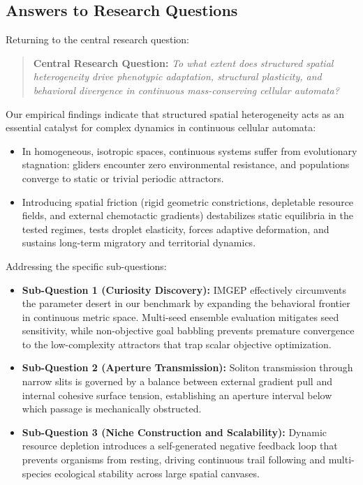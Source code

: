 \subsection{Answers to Research Questions}
\label{subsec:concl_answers}

Returning to the central research question:

\begin{quote}
\textbf{Central Research Question:} \textit{To what extent does structured spatial heterogeneity drive phenotypic adaptation, structural plasticity, and behavioral divergence in continuous mass-conserving cellular automata?}
\end{quote}

Our empirical findings indicate that structured spatial heterogeneity acts as an essential catalyst for complex dynamics in continuous cellular automata:
\begin{itemize}
    \item In homogeneous, isotropic spaces, continuous systems suffer from evolutionary stagnation: gliders encounter zero environmental resistance, and populations converge to static or trivial periodic attractors.
    \item Introducing spatial friction (rigid geometric constrictions, depletable resource fields, and external chemotactic gradients) destabilizes static equilibria in the tested regimes, tests droplet elasticity, forces adaptive deformation, and sustains long-term migratory and territorial dynamics.
\end{itemize}

Addressing the specific sub-questions:
\begin{itemize}
    \item \textbf{Sub-Question 1 (Curiosity Discovery):} IMGEP effectively circumvents the parameter desert in our benchmark by expanding the behavioral frontier in continuous metric space. Multi-seed ensemble evaluation mitigates seed sensitivity, while non-objective goal babbling prevents premature convergence to the low-complexity attractors that trap scalar objective optimization.
    \item \textbf{Sub-Question 2 (Aperture Transmission):} Soliton transmission through narrow slits is governed by a balance between external gradient pull and internal cohesive surface tension, establishing an aperture interval below which passage is mechanically obstructed.
    \item \textbf{Sub-Question 3 (Niche Construction and Scalability):} Dynamic resource depletion introduces a self-generated negative feedback loop that prevents organisms from resting, driving continuous trail following and multi-species ecological stability across large spatial canvases.
\end{itemize}

